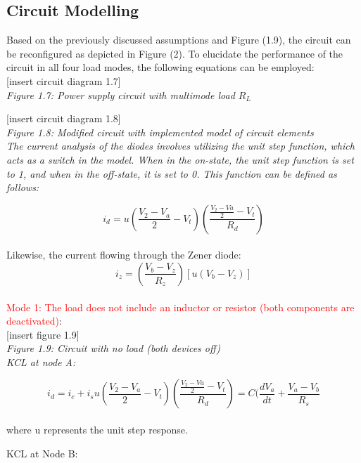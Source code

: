 \subsection{Circuit Modelling}
Based on the previously discussed assumptions and Figure (1.9), the circuit can be reconfigured as depicted in Figure (2). To elucidate the performance of the circuit in all four load modes, the following equations can be employed:\\

[insert circuit diagram 1.7]\\

\em{Figure 1.7: Power supply circuit with multimode load $R_L$}

[insert circuit diagram 1.8]\\

\em{Figure 1.8: Modified circuit with implemented model of circuit elements}\\

The current analysis of the diodes involves utilizing the unit step function, which acts as a switch in the model. When in the on-state, the unit step function is set to 1, and when in the off-state, it is set to 0. This function can be defined as follows:

\begin{equation}
    i_d=u(\frac{V_2-V_a}{2}-V_t)(\frac{\frac{V_2-Va}{2}-V_t}{R_d})
\end{equation}\\

Likewise, the current flowing through the Zener diode:\\

\begin{equation}
    i_z=(\frac{V_b-V_z}{R_z})[u(V_b-V_z)]
\end{equation}\\

\large\textcolor{red}{Mode 1: The load does not include an inductor or resistor (both components are deactivated)}:\\

[insert figure 1.9]\\

\em{Figure 1.9: Circuit with no load (both devices off)}\\

KCL at node A:

\begin{equation}
    i_d=i_c+i_s
    u(\frac{V_2-V_a}{2}-V_t)(\frac{\frac{V_2-Va}{2}-V_t}{R_d})=C(\frac{dV_a}{dt}+\frac{V_a-V_b}{R_s}
\end{equation}\\

where u represents the unit step response.

KCL at Node B:


